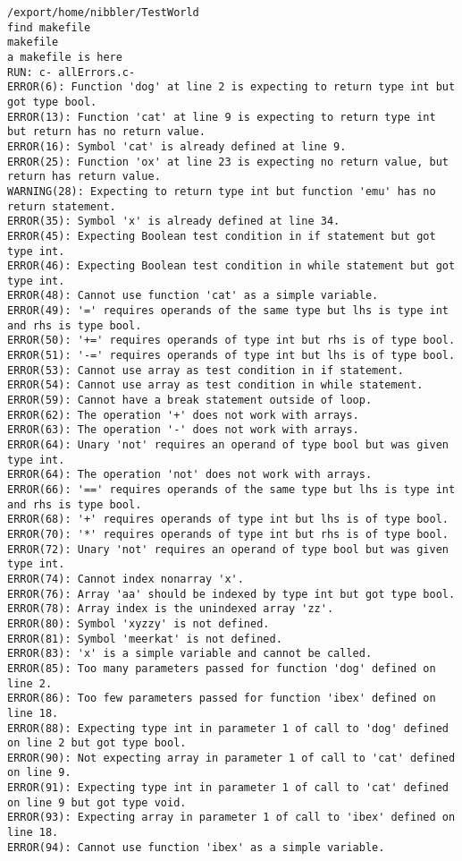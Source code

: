 \documentclass[12pt]{book}
\begin{document}
\begin{lstlisting}
/export/home/nibbler/TestWorld
find makefile
makefile
a makefile is here
RUN: c- allErrors.c-
ERROR(6): Function 'dog' at line 2 is expecting to return type int but got type bool.
ERROR(13): Function 'cat' at line 9 is expecting to return type int but return has no return value.
ERROR(16): Symbol 'cat' is already defined at line 9.
ERROR(25): Function 'ox' at line 23 is expecting no return value, but return has return value.
WARNING(28): Expecting to return type int but function 'emu' has no return statement.
ERROR(35): Symbol 'x' is already defined at line 34.
ERROR(45): Expecting Boolean test condition in if statement but got type int.
ERROR(46): Expecting Boolean test condition in while statement but got type int.
ERROR(48): Cannot use function 'cat' as a simple variable.
ERROR(49): '=' requires operands of the same type but lhs is type int and rhs is type bool.
ERROR(50): '+=' requires operands of type int but rhs is of type bool.
ERROR(51): '-=' requires operands of type int but lhs is of type bool.
ERROR(53): Cannot use array as test condition in if statement.
ERROR(54): Cannot use array as test condition in while statement.
ERROR(59): Cannot have a break statement outside of loop.
ERROR(62): The operation '+' does not work with arrays.
ERROR(63): The operation '-' does not work with arrays.
ERROR(64): Unary 'not' requires an operand of type bool but was given type int.
ERROR(64): The operation 'not' does not work with arrays.
ERROR(66): '==' requires operands of the same type but lhs is type int and rhs is type bool.
ERROR(68): '+' requires operands of type int but lhs is of type bool.
ERROR(70): '*' requires operands of type int but rhs is of type bool.
ERROR(72): Unary 'not' requires an operand of type bool but was given type int.
ERROR(74): Cannot index nonarray 'x'.
ERROR(76): Array 'aa' should be indexed by type int but got type bool.
ERROR(78): Array index is the unindexed array 'zz'.
ERROR(80): Symbol 'xyzzy' is not defined.
ERROR(81): Symbol 'meerkat' is not defined.
ERROR(83): 'x' is a simple variable and cannot be called.
ERROR(85): Too many parameters passed for function 'dog' defined on line 2.
ERROR(86): Too few parameters passed for function 'ibex' defined on line 18.
ERROR(88): Expecting type int in parameter 1 of call to 'dog' defined on line 2 but got type bool.
ERROR(90): Not expecting array in parameter 1 of call to 'cat' defined on line 9.
ERROR(91): Expecting type int in parameter 1 of call to 'cat' defined on line 9 but got type void.
ERROR(93): Expecting array in parameter 1 of call to 'ibex' defined on line 18.
ERROR(94): Cannot use function 'ibex' as a simple variable.

\end{lstlisting}
\end{document}
